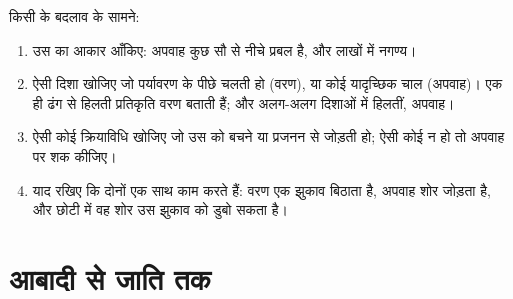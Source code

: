 \begin{method}\label{met:g12:selection-drift-speciation:which}
किसी  के बदलाव के सामने:
\begin{enumerate}
  \item उस  का आकार आँकिए: अपवाह कुछ सौ से नीचे प्रबल है, और लाखों में
        नगण्य।
  \item ऐसी दिशा खोजिए जो पर्यावरण के पीछे चलती हो (वरण), या कोई यादृच्छिक
        चाल (अपवाह)। एक ही ढंग से हिलती प्रतिकृति  वरण बताती हैं;
        और अलग-अलग दिशाओं में हिलतीं, अपवाह।
  \item ऐसी कोई क्रियाविधि खोजिए जो उस  को बचने या प्रजनन से
        जोड़ती हो; ऐसी कोई न हो तो अपवाह पर शक कीजिए।
  \item याद रखिए कि दोनों एक साथ काम करते हैं: वरण एक झुकाव बिठाता है,
        अपवाह शोर जोड़ता है, और छोटी  में वह शोर उस झुकाव को डुबो
        सकता है।
\end{enumerate}
\end{method}

\section{आबादी से जाति तक}

